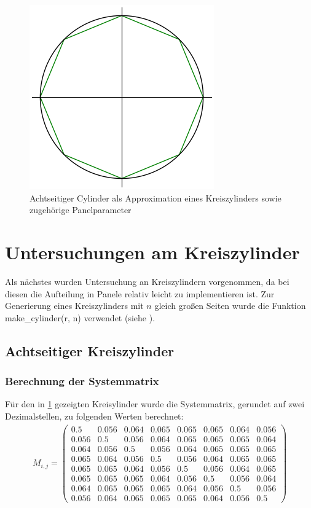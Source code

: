 \begin{figure}[!h]
\begin{center}
\includegraphics[scale=0.7]{figures/cylinderascircle.png} 
\caption{Achtseitiger Cylinder als Approximation eines Kreiszylinders sowie zugehörige Panelparameter}
\label{fig:cylinder8}
\end{center}
\end{figure}
\section{Untersuchungen am  Kreiszylinder}

Als nächstes wurden Untersuchung an Kreiszylindern vorgenommen, da bei diesen die Aufteilung in Panele relativ leicht zu implementieren ist. Zur Generierung eines Kreiszylinders mit $n$ gleich großen Seiten wurde die Funktion make\_cylinder(r, n) verwendet (siehe ).
\subsection{Achtseitiger Kreiszylinder}
\subsubsection{Berechnung der Systemmatrix}
Für den in \ref{fig:cylinder8} gezeigten Kreisylinder wurde die Systemmatrix, gerundet auf zwei Dezimalstellen, zu folgenden Werten berechnet:
\begin{align*}
M_{i,j} = 
\begin{pmatrix}
0.5&0.056&0.064&0.065&0.065&0.065&0.064&0.056 \\
0.056&0.5&0.056&0.064&0.065&0.065&0.065&0.064\\
0.064&0.056&0.5&0.056&0.064&0.065&0.065&0.065\\
0.065&0.064&0.056&0.5&0.056&0.064&0.065&0.065\\
0.065&0.065&0.064&0.056&0.5&0.056&0.064&0.065\\
0.065&0.065&0.065&0.064&0.056&0.5&0.056&0.064\\
0.064&0.065&0.065&0.065&0.064&0.056&0.5&0.056\\
0.056&0.064&0.065&0.065&0.065&0.064&0.056&0.5
\end{pmatrix}
\end{align*}
